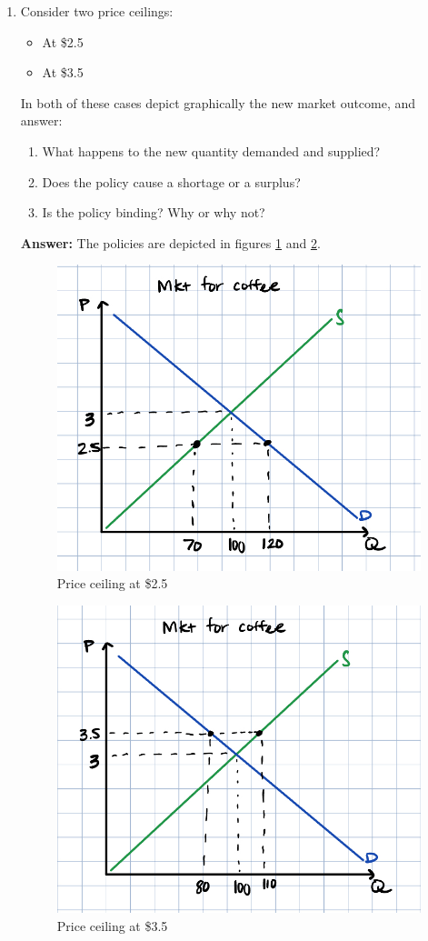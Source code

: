 \documentclass[12pt]{article}
\begin{document}
\begin{enumerate}

\item Consider two price ceilings:
    \begin{itemize}
        \item At \$2.5
        \item At \$3.5
    \end{itemize}

    \vspace{5mm}

    In both of these cases depict graphically the new market outcome, and answer:
    \begin{enumerate}
        \item What happens to the new quantity demanded and supplied?
        \item Does the policy cause a shortage or a surplus?
        \item Is the policy binding? Why or why not?
    \end{enumerate}

    \textbf{Answer:}
The policies are depicted in figures \ref{fig:coffee_ceiling_250} and \ref{fig:coffee_ceiling_350}.

\begin{figure}
    \centering
    \includegraphics[width=.6\textwidth]{coffee_ceiling_250.png}
    \caption{Price ceiling at \$2.5}
    \label{fig:coffee_ceiling_250}
\end{figure}

\begin{figure}
    \centering
    \includegraphics[width=.6\textwidth]{coffee_ceiling_350.png}
    \caption{Price ceiling at \$3.5}
    \label{fig:coffee_ceiling_350}
\end{figure}



\end{enumerate}
\end{document}
